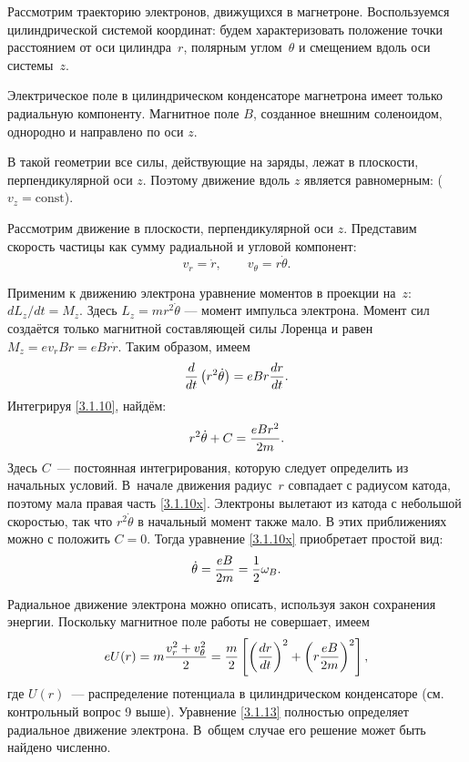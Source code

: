 \begin{labsupplement}

Рассмотрим траекторию электронов, движущихся в магнетроне.
Воспользуемся цилиндрической системой координат: будем характеризовать 
положение точки расстоянием от оси цилиндра~$r$, 
полярным углом~$\theta$ и смещением вдоль оси системы~$z$.

Электрическое поле в цилиндрическом конденсаторе магнетрона
имеет только радиальную компоненту. Магнитное поле $B$, 
созданное внешним соленоидом, однородно и направлено по оси $z$.
 
В такой геометрии все силы, действующие на заряды, лежат в плоскости,
перпендикулярной оси $z$.  Поэтому движение вдоль $z$ является равномерным:
($v_z=\mathrm{const}$).

Рассмотрим движение в плоскости, перпендикулярной оси $z$. 
Представим скорость частицы как сумму радиальной и угловой компонент:
\[
 v_r=\dot{r},\qquad v_{\theta} = r\dot{\theta}.
\]

Применим к движению электрона уравнение моментов в проекции на~$z$:
$dL_z/dt = M_z$.
Здесь $L_z = mr^2 \dot{\theta}$ --- момент импульса электрона.
Момент сил создаётся только магнитной составляющей силы Лоренца и равен
$M_z = e v_r B r =  e B r \dot{r}$. Таким образом, имеем
\begin{equation}
\eqmark{3.1.10}
\frac{d}{dt}\left(r^2\dot{\theta}\right) = eBr\frac{dr}{dt}.
\end{equation}
Интегрируя \eqref{3.1.10}, найдём:
\begin{equation}
	r^2\dot{\theta}+C=\frac{eBr^2}{2m}.
	\eqmark{3.1.10x}
\end{equation}
Здесь $C$~--- постоянная интегрирования, которую следует определить из начальных
условий. В~начале движения радиус~$r$ совпадает с радиусом катода,
поэтому мала правая часть \eqref{3.1.10x}. Электроны вылетают из
катода с небольшой скоростью, так что $r^{2}\dot{\theta}$ в начальный момент
также мало. В этих приближениях можно с положить $C=0$. 
Тогда уравнение \eqref{3.1.10x} приобретает простой вид:
\begin{equation}
	\dot{\theta}=\frac{eB}{2m} = \frac12 \omega_B.
	\eqmark{3.1.12}
\end{equation}

Радиальное движение электрона можно описать, используя закон сохранения
энергии. Поскольку магнитное поле работы не совершает, имеем
\begin{equation}	\eqmark{3.1.13}
eU(r)=m\frac{v_r^2+v_\theta^2}{2} = 
\frac{m}{2} \left[\left(\frac{dr}{dt}\right)^2 + \left(r \frac{eB}{2m}\right)^{2}\right],
\end{equation}
где $U(r)$~--- распределение потенциала в цилиндрическом конденсаторе 
(см. контрольный вопрос 9 выше).
Уравнение \eqref{3.1.13} полностью определяет радиальное 
движение электрона. В~общем случае его решение может быть найдено численно.


\end{labsupplement}
